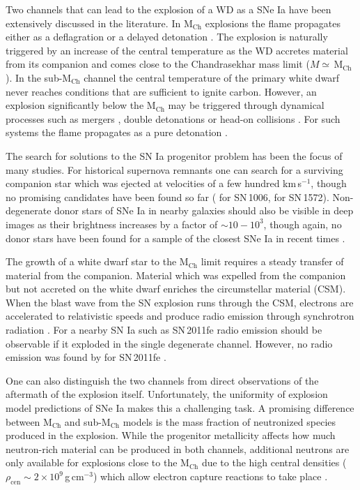\documentclass[fleqn,usenatbib]{mnras}
\begin{document}
Two channels that can lead to the explosion of a WD as a SNe Ia have been extensively discussed in the literature. In M$_{\text{Ch}}$ explosions the flame propagates either as a deflagration \citep{2014MNRAS.438.1762F} or a delayed detonation \citep{2013MNRAS.429.1156S}. The explosion is naturally triggered by an increase of the central temperature as the WD accretes material from its companion and comes close to the Chandrasekhar mass limit ($M\simeq\,$M$_{\text{Ch}}$). In the sub-M$_{\text{Ch}}$ channel the central temperature of the primary white dwarf never reaches conditions that are sufficient to ignite carbon. However, an explosion significantly below the M$_{\text{Ch}}$ may be triggered through dynamical processes such as mergers \citep{2010Natur.463...61P}, double detonations \citep{2010A&A...514A..53F, 2018ApJ...854...52S} or head-on collisions \citep{2013ApJ...778L..37K}. For such systems the flame propagates as a pure detonation \citep{2010ApJ...714L..52S}.

The search for solutions to the SN Ia progenitor problem has been the focus of many studies. 
For historical supernova remnants one can search for a surviving companion star which was ejected at velocities of a few hundred km\,s$^{-1}$, though no promising candidates have been found so far (\citeauthor{2018MNRAS.479..192K} \citeyear{2018MNRAS.479..192K} for SN\,1006, \citeauthor{2018MNRAS.479.5696K} \citeyear{2018MNRAS.479.5696K} for SN\,1572). 
Non-degenerate donor stars of SNe Ia in nearby galaxies should also be visible in deep images as their brightness increases by a factor of $\sim10 - 10^3$, though again, no donor stars have been found for a sample of the closest SNe Ia in recent times \citep{2013ApJ...765..150S}. 

The growth of a white dwarf star to the M$_{\text{Ch}}$ limit requires a steady transfer of material from the companion. Material which was expelled from the companion but not accreted on the white dwarf enriches the circumstellar material (CSM). When the blast wave from the SN explosion runs through the CSM, electrons are accelerated to relativistic speeds and produce radio emission through synchrotron radiation \citep{1982ApJ...259..302C, 1998ApJ...499..810C, 2006ApJ...651..381C}. For a nearby SN Ia such as SN\,2011fe radio emission should be observable if it exploded in the single degenerate channel. However, no radio emission was found by \citet{2012ApJ...746...21H} for SN\,2011fe . 

One can also distinguish the two channels from direct observations of the aftermath of the explosion itself. Unfortunately, the uniformity of explosion model predictions of SNe Ia makes this a challenging task. A promising difference between M$_{\text{Ch}}$ and sub-M$_{\text{Ch}}$ models is the mass fraction of neutronized species produced in the explosion. While the progenitor metallicity affects how much neutron-rich material can be produced in both channels, additional neutrons are only available for explosions close to the M$_{\text{Ch}}$ due to the high central densities ($\rho_{\text{cen}} \sim 2\times 10^9$\,g\,cm$^{-3}$) which allow electron capture reactions to take place \citep{1999ApJS..125..439I, 2013MNRAS.429.1156S}. 
\end{document}
